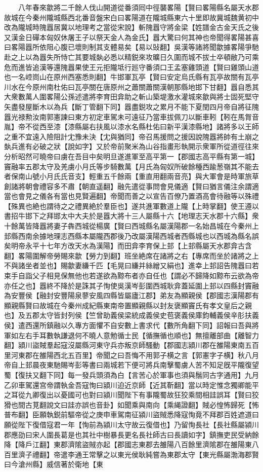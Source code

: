 　　八年春來歙將二千餘人伐山開道從番須囘中徑襲畧陽【賢曰畧陽縣名屬天水郡故城在今秦州隴城縣西北番音盤宋白曰畧陽道在隴城縣東六十里即故冀城魏黄初中改為隴城時隗囂居冀以地理考之當從宋說】斬隗囂守將金梁【姓譜金古金天氏之後又漢金日磾本匈奴休屠王子以祭天金人為金氏】囂大驚曰何其神也帝聞得畧陽甚喜曰畧陽囂所依阻心腹已壞則制其支體易矣【易以䜴翻】吳漢等諸將聞歙據畧陽爭馳赴之上以為囂失所恃亡其要城埶必悉以精鋭來攻曠日久圍而城不拔士卒頓敝乃可乘危而進皆追漢等還隗囂果使王元拒隴坻行廵守番須口王孟塞雞頭道【賢曰雞頭山道也一名崆峝山在原州西塞悉則翻】牛邯軍瓦亭【賢曰安定烏氏縣有瓦亭故關有瓦亭川水在今原州南杜佑曰瓦亭關在唐原州之蕭關蕭關漢朝那縣地邯下甘翻】囂自悉其大衆數萬人圍畧陽公孫述遣將李育田弇助之斬山築堤激水灌城來歙與將士固死堅守矢盡發屋斷木以為兵【斷丁管翻下同】囂盡鋭攻之累月不能下夏閏四月帝自將征隗囂光禄勲汝南郭憲諫曰東方初定車駕未可遠征乃當車拔佩刀以斷車靷【靷在馬胷音胤】帝不從西至漆【漆縣屬右扶風以漆水名縣杜佑曰新平漢漆縣地】諸將多以王師之重不宜遠入險阻計冘豫未決【冘與猶同】帝召馬援問之援因說隗囂將帥有土崩之埶兵進有必破之狀【說如字】又於帝前聚米為山谷指畫形執開示衆軍所從道徑往來分析昭然可曉帝曰虜在吾目中矣明旦遂進軍至高平第一【郡國志高平縣有第一城】竇融率五郡太守及羌虜小月氏等步騎數萬【月氏為匈奴所破餘種西踰葱嶺其不能去者保南山號小月氏氏音支】輕重五千餘兩【重直用翻兩音亮】與大軍會是時軍旅草創諸將朝會禮容多不肅【朝直遥翻】融先遣從事問會見儀適【賢曰猶言儀注余謂適當也會見之儀各有當也見賢遍翻】帝聞而善之以宣告百僚乃置酒高會待融等以殊禮【殊異也絶也謂待之之禮異絶於羣臣也】遂共進軍數道上隴【上時掌翻】使王遵以書招牛邯下之拜邯太中大夫於是囂大將十三人屬縣十六【地理志天水郡十六縣】衆十餘萬皆降囂將妻子犇西城從楊廣【賢曰西城縣名屬漢陽郡一名始昌城在今秦州上邽縣西南余據地理志西縣本屬隴西郡後乃改屬漢陽西城者西縣城也以西城為縣名誤矣明帝永平十七年方改天水為漢陽】而田弇李育保上邽【上邽縣屬天水郡弇古含翻】畧陽圍解帝勞賜來歙【勞力到翻】班坐絶席在諸將之右【專席而坐於諸將之上不與諸坐者並也】賜歙妻縑千匹【毛晃曰縑并絲繒又絹也】進幸上邽詔告隗囂曰若束手自詣父子相見保無他也若遂欲為黥布者亦自任也【謂必不歸降如黥布云欲為帝亦任之也】囂終不降於是誅其子恂使吳漢岑彭圍西城耿弇蓋延圍上邽以四縣封竇融為安豐侯【融封安豐陽泉蓼安風四縣皆屬廬江郡】弟友為顯親侯【郡國志漢陽郡有顯親縣賢曰故城在今秦州成紀縣東南帝置顯親縣以封友褒顯竇氏有孝文皇后之親也】及五郡太守皆封列侯【竺曾助義侯梁統成義侯史苞褒義侯庫鈞輔義侯辛肜扶義侯】遣西還所鎮融以久專方面懼不自安數上書求代【數所角翻下同】詔報曰吾與將軍如左右手耳數執謙退何不曉人意勉循士民【循撫循也順也】無擅離部曲【離智力翻】潁川盜賊羣起寇沒屬縣河東守兵亦叛京師騷動【郡國志潁川郡在雒陽東南五百里河東郡在雒陽西北五百里】帝聞之曰吾悔不用郭子横之言【郭憲字子横】秋八月帝自上邽晨夜東馳賜岑彭等書曰兩城若下便可將兵南擊蜀虜人苦不知足旣平隴復望蜀【復扶又翻下同】每一發兵頭須為白【言苦心於軍事也須與鬚同古字通用】九月乙卯車駕還宫帝謂執金吾寇恂曰潁川迫近京師【近其靳翻】當以時定惟念獨卿能平之耳從九卿復出以憂國可也對曰潁川聞陛下有事隴蜀故狂狡乘間相詿誤耳【賢曰狡猾也間古莧翻說文曰詿亦誤也音卦】如聞乘與南向【乘䋲證翻】賊必惶怖歸死【怖普布翻】臣願執鋭前驅帝從之庚申車駕南征潁川盜賊悉降寇恂竟不拜郡百姓遮道曰願從陛下復借寇君一年【恂前為潁川太守故云復借也】乃留恂長社【長社縣屬潁川郡應劭曰宋人圍長葛是也其社中樹暴長更名長社師古曰長讀如字】鎮撫吏民受納餘降【降戶江翻】東郡濟隂盜賊亦起【郡國志東郡去雒陽八百餘里濟隂郡在雒陽東八百里濟子禮翻】帝遣李通王常擊之以東光侯耿純嘗為東郡太守【東光縣屬渤海郡賢曰今滄州縣】威信著於衛地【東